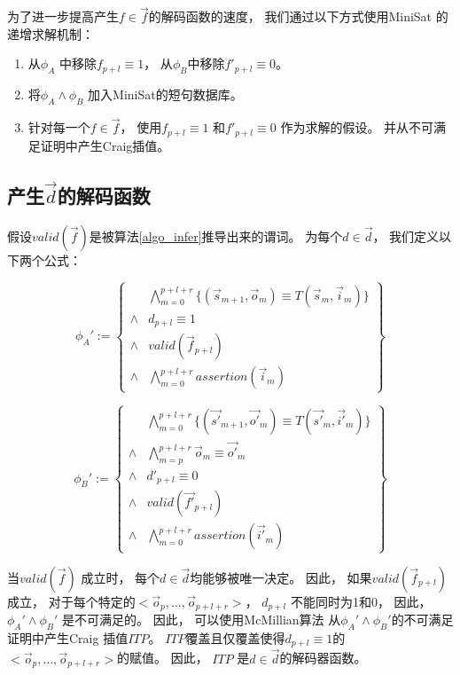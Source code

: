 为了进一步提高产生$f\in\vec{f}$的解码函数的速度，
我们通过以下方式使用MiniSat 的递增求解机制：
\begin{enumerate}
 \item
 从$\phi_A$ 中移除$f_{p+l}\equiv 1$，
 从$\phi_B$中移除$f'_{p+l}\equiv 0$。
 \item
 将$\phi_A\wedge \phi_B$ 加入MiniSat的短句数据库。
 \item
 针对每一个$f\in\vec{f}$，
 使用$f_{p+l}\equiv 1$ 和$f'_{p+l}\equiv 0$ 作为求解的假设。
 并从不可满足证明中产生Craig插值。
\end{enumerate}

\subsection{产生$\vec{d}$的解码函数}

假设$valid(\vec{f})$是被算法\ref{algo_infer}推导出来的谓词。
为每个$d\in\vec{d}$，
我们定义以下两个公式：

\begin{equation}\label{da}
\phi_A':=
\left\{
\begin{array}{cc}
&\bigwedge_{m=0}^{p+l+r}
\{
(\vec{s}_{m+1},\vec{o}_m)\equiv T(\vec{s}_m,\vec{i}_m)
\}
\\
\wedge& d_{p+l}\equiv 1 \\
\wedge& valid(\vec{f}_{p+l}) \\
\wedge&\bigwedge_{m=0}^{p+l+r}assertion(\vec{i}_m)
\end{array}
\right\}
\end{equation}

\begin{equation}\label{db}
\phi_B':=
\left\{
\begin{array}{cc}
&\bigwedge_{m=0}^{p+l+r}
\{
(\vec{s'}_{m+1},\vec{o'}_m)\equiv T(\vec{s'}_m,\vec{i'}_m)
\}
\\
\wedge&\bigwedge_{m=p}^{p+l+r}\vec{o}_m\equiv \vec{o'}_m \\
\wedge& d'_{p+l}\equiv 0\\
\wedge& valid(\vec{f'}_{p+l})\\
\wedge&\bigwedge_{m=0}^{p+l+r}assertion(\vec{i'}_m)
\end{array}
\right\}
\end{equation}

当$valid(\vec{f})$ 成立时，
每个$d\in \vec{d}$均能够被唯一决定。
因此，
如果$valid(\vec{f}_{p+l})$ 成立，
对于每个特定的$<\vec{o}_p,\dots,\vec{o}_{p+l+r}>$，
$d_{p+l}$ 不能同时为1和0，
因此，
$\phi_A'\wedge \phi_B'$ 是不可满足的。
因此，
 可以使用McMillian算法 从$\phi_A'\wedge \phi_B'$的不可满足证明中产生Craig 插值$ITP$。
$ITP$覆盖且仅覆盖使得$d_{p+l}\equiv 1$的$<\vec{o}_p,\dots,\vec{o}_{p+l+r}>$的赋值。
因此，
$ITP$ 是$d\in\vec{d}$的解码器函数。

